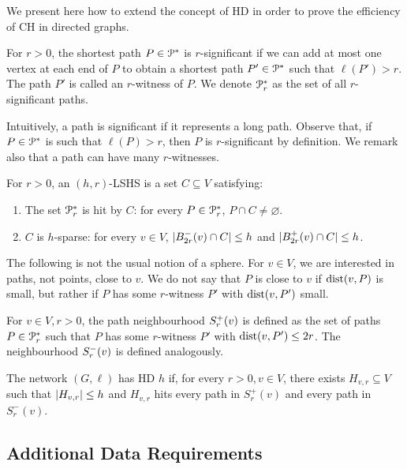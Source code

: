 \label{sec:ch}
We present here how to extend the concept of HD in order to prove the efficiency of CH in directed graphs.

\begin{definition}
	For $r>0$, the shortest path $P\in\mathcal{P}^*$ is $r$-significant if we can add at most one vertex at each end of $P$ to obtain a shortest path $P'\in\mathcal{P}^*$ such that $\ell(P')>r$.
	The path $P'$ is called an $r$-witness of $P$.
	We denote $\mathcal{P}^*_r$ as the set of all $r$-significant paths.
\end{definition}


Intuitively, a path is significant if it represents a long path.
Observe that, if $P\in\mathcal{P}^*$ is such that $\ell(P)>r$, then $P$ is $r$-significant by definition.
We remark also that a path can have many $r$-witnesses.

\begin{definition}
	For $r>0$, an $(h,r)$-LSHS is a set $C\subseteq V$ satisfying: 
	\begin{enumerate}
		\item The set $\mathcal{P}^*_r$ is hit by $C$: for every $P\in\mathcal{P}^*_r$, $P\cap C\not=\varnothing$.
		\item $C$ is $h$-sparse: for every $v\in V$, $\lvert B^-_{2r}(v)\cap C\rvert\leq h$ and $\lvert B^+_{2r}(v)\cap C\rvert\leq h$.
	\end{enumerate}
\end{definition}

The following is not the usual notion of a sphere.
For $v\in V$, we are interested in paths, not points, close to $v$.
We do not say that $P$ is close to $v$ if $\text{dist}(v,P)$ is small, but rather if $P$ has some $r$-witness $P'$ with $\text{dist}(v,P')$ small.


\begin{definition}
	For $v\in V, r>0$, the path neighbourhood  $S^+_r(v)$ is defined as the set of paths $P\in\mathcal{P}^*_r$ such that $P$ has some $r$-witness $P'$ with $\text{dist}(v,P')\leq 2r$.
	The neighbourhood $S^-_r(v)$ is defined analogously.
\end{definition}

\begin{definition}
	The network $(G,\ell)$ has HD $h$ if, for every $r>0, v\in V$, there exists $H_{v,r}\subseteq V$ such that $\lvert H_{v,r}\rvert\leq h$ and $H_{v,r}$ hits every path in $S_r^+(v)$ and every path in $S_r^-(v)$.
\end{definition}


\subsection{Additional Data Requirements}

